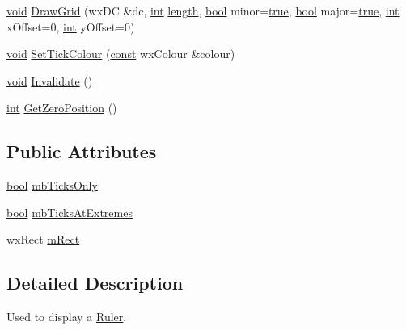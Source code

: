 \begin{DoxyCompactItemize}
\hyperlink{sound_8c_ae35f5844602719cf66324f4de2a658b3}{void} \hyperlink{class_ruler_a5a68ca4b86ce8ce542022aad91676953}{Draw\+Grid} (wx\+DC \&dc, \hyperlink{xmltok_8h_a5a0d4a5641ce434f1d23533f2b2e6653}{int} \hyperlink{test__lib_f_l_a_c_2format_8c_ac94dc16b22556ba5fa815655f27442da}{length}, \hyperlink{mac_2config_2i386_2lib-src_2libsoxr_2soxr-config_8h_abb452686968e48b67397da5f97445f5b}{bool} minor=\hyperlink{mac_2config_2i386_2lib-src_2libsoxr_2soxr-config_8h_a41f9c5fb8b08eb5dc3edce4dcb37fee7}{true}, \hyperlink{mac_2config_2i386_2lib-src_2libsoxr_2soxr-config_8h_abb452686968e48b67397da5f97445f5b}{bool} major=\hyperlink{mac_2config_2i386_2lib-src_2libsoxr_2soxr-config_8h_a41f9c5fb8b08eb5dc3edce4dcb37fee7}{true}, \hyperlink{xmltok_8h_a5a0d4a5641ce434f1d23533f2b2e6653}{int} x\+Offset=0, \hyperlink{xmltok_8h_a5a0d4a5641ce434f1d23533f2b2e6653}{int} y\+Offset=0)
\item 
\hyperlink{sound_8c_ae35f5844602719cf66324f4de2a658b3}{void} \hyperlink{class_ruler_a0984f87c4866a21e9eac5f1d81bf081e}{Set\+Tick\+Colour} (\hyperlink{getopt1_8c_a2c212835823e3c54a8ab6d95c652660e}{const} wx\+Colour \&colour)
\item 
\hyperlink{sound_8c_ae35f5844602719cf66324f4de2a658b3}{void} \hyperlink{class_ruler_aed3aa9dbfa4c6f4a4bf2d828069b3576}{Invalidate} ()
\item 
\hyperlink{xmltok_8h_a5a0d4a5641ce434f1d23533f2b2e6653}{int} \hyperlink{class_ruler_abd5514aa5e7159f0e35ac2a056d3eb9a}{Get\+Zero\+Position} ()
\end{DoxyCompactItemize}
\subsection*{Public Attributes}
\begin{DoxyCompactItemize}
\item 
\hyperlink{mac_2config_2i386_2lib-src_2libsoxr_2soxr-config_8h_abb452686968e48b67397da5f97445f5b}{bool} \hyperlink{class_ruler_a5198b436d8a21213a07947ac22e0dac9}{mb\+Ticks\+Only}
\item 
\hyperlink{mac_2config_2i386_2lib-src_2libsoxr_2soxr-config_8h_abb452686968e48b67397da5f97445f5b}{bool} \hyperlink{class_ruler_ab26f0f7159425ba42f51d9a4349a5523}{mb\+Ticks\+At\+Extremes}
\item 
wx\+Rect \hyperlink{class_ruler_ab4db84a1b529ca41c65127d2e692785f}{m\+Rect}
\end{DoxyCompactItemize}


\subsection{Detailed Description}
Used to display a \hyperlink{class_ruler}{Ruler}. 

